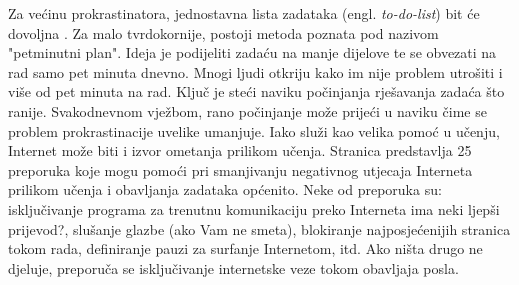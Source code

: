 Za većinu prokrastinatora, jednostavna lista zadataka (engl. \emph{to-do-list})
bit će dovoljna \cite{TuckerPsySelfHelp}. Za malo tvrdokornije, postoji metoda
poznata pod nazivom "petminutni plan". Ideja je podijeliti zadaću na manje
dijelove te se obvezati na rad samo pet minuta dnevno. Mnogi ljudi otkriju kako
im nije problem utrošiti i više od pet minuta na rad. Ključ je steći naviku
počinjanja rješavanja zadaća što ranije. Svakodnevnom vježbom, rano počinjanje
može prijeći u naviku čime se problem prokrastinacije uvelike umanjuje. Iako
služi kao velika pomoć u učenju, Internet može biti i izvor ometanja prilikom
učenja. Stranica \cite{ColDeg25ways} predstavlja 25 preporuka koje mogu pomoći
pri smanjivanju negativnog utjecaja Interneta prilikom učenja i obavljanja
zadataka općenito. Neke od preporuka su: isključivanje programa za trenutnu
komunikaciju preko Interneta {ima neki ljepši prijevod?}, slušanje glazbe (ako
Vam ne smeta), blokiranje najposjećenijih stranica tokom rada, definiranje
pauzi za surfanje Internetom, itd. Ako ništa drugo ne djeluje, preporuča se
isključivanje internetske veze tokom obavljaja posla.
